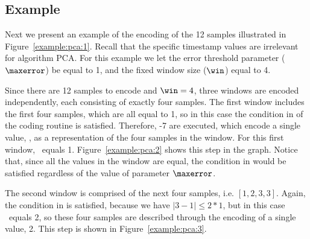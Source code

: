 \vspace{+20pt}



\clearpage




\subsection{Example}
\label{algo:pca:example}
\newcommand{\exampleRecallIrrelevant}[1]{Recall that the specific timestamp values are irrelevant for algorithm #1}


Next we present an example of the encoding of the 12 samples illustrated in Figure~\ref{example:pca:1}. \exampleRecallIrrelevant{PCA}. For this example we let the error threshold parameter ($\maxerror$) be equal to 1, and the fixed window size ($\win$) equal to 4.


\vspace{-10pt}


Since there are 12 samples to encode and $\win=4$, three windows are encoded independently, each consisting of exactly four samples. The first window includes the first four samples, which are all equal to 1, so in this case the condition in  of the coding routine is satisfied. Therefore, -7 are executed, which encode a single value, \midrange, as a representation of the four samples in the window. For this first window, \midrange\ equals 1. Figure~\ref{example:pca:2} shows this step in the graph. Notice that, since all the values in the window are equal, the condition in  would be satisfied regardless of the value of parameter $\maxerror$.




\clearpage


The second window is comprised of the next four samples, i.e. $[1, 2, 3, 3]$. Again, the condition in  is satisfied, because we have $|3 - 1| \leq 2*1$, but in this case \midrange\ equals 2, so these four samples are described through the encoding of a single value, 2. This step is shown in Figure~\ref{example:pca:3}.





